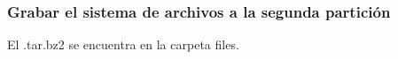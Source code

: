 \documentclass[12pt]{article}
\begin{document}
\subsubsection{Grabar el sistema de archivos a la segunda partición}
\noindent
El .tar.bz2 se encuentra en la carpeta files.
\begin{center}
\end{center}


% 
% 
% 
% 
% 
% 
% 
% 
% 
% 
% 
% 
% 
% 
% 
% 
% 
% 
% 
% 
% 
% 
\end{document}
